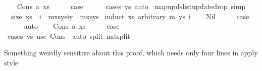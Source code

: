 \begin{isabellebody}
\isamarkupfalse%
\isanewline
\ \ \isamarkupfalse%
\ {\isacharparenleft}{\kern0pt}Cons\ a\ xs{\isacharparenright}{\kern0pt}\isanewline
\ \ \isamarkupfalse%
\ \isamarkupfalse%
\ {\isacharquery}{\kern0pt}case\isanewline
\ \ \ \ \isamarkupfalse%
\ {\isacharparenleft}{\kern0pt}cases\ ys{\isacharparenright}{\kern0pt}\ auto\isanewline
{}\isamarkupfalse%
%
\endisatagproof
{\isafoldproof}%
%
\isadelimproof
\isanewline
%
\endisadelimproof
\isanewline
{}\isamarkupfalse%
\ map{\isacharunderscore}{\kern0pt}upds{\isacharunderscore}{\kern0pt}list{\isacharunderscore}{\kern0pt}update{}{\isacharunderscore}{\kern0pt}drop\ {\isacharbrackleft}{\kern0pt}simp{\isacharbrackright}{\kern0pt}{\isacharcolon}{\kern0pt}\isanewline
\ \ {\isachardoublequoteopen}size\ xs\ {\isasymle}\ i\ {\isasymLongrightarrow}\ m{\isacharparenleft}{\kern0pt}xs{\isacharbrackleft}{\kern0pt}{\isasymmapsto}{\isacharbrackright}{\kern0pt}ys{\isacharbrackleft}{\kern0pt}i{\isacharcolon}{\kern0pt}{\isacharequal}{\kern0pt}y{\isacharbrackright}{\kern0pt}{\isacharparenright}{\kern0pt}\ {\isacharequal}{\kern0pt}\ m{\isacharparenleft}{\kern0pt}xs{\isacharbrackleft}{\kern0pt}{\isasymmapsto}{\isacharbrackright}{\kern0pt}ys{\isacharparenright}{\kern0pt}{\isachardoublequoteclose}\isanewline
%
\isadelimproof
%
\endisadelimproof
%
\isatagproof
{}\isamarkupfalse%
\ {\isacharparenleft}{\kern0pt}induct\ xs\ arbitrary{\isacharcolon}{\kern0pt}\ m\ ys\ i{\isacharparenright}{\kern0pt}\isanewline
\ \ \isamarkupfalse%
\ Nil\isanewline
\ \ \isamarkupfalse%
\ \isamarkupfalse%
\ {\isacharquery}{\kern0pt}case\isanewline
\ \ \ \ \isamarkupfalse%
\ auto\isanewline
{}\isamarkupfalse%
\isanewline
\ \ \isamarkupfalse%
\ {\isacharparenleft}{\kern0pt}Cons\ a\ xs{\isacharparenright}{\kern0pt}\isanewline
\ \ \isamarkupfalse%
\ \isamarkupfalse%
\ {\isacharquery}{\kern0pt}case\isanewline
\ \ \ \ \isamarkupfalse%
\ {\isacharparenleft}{\kern0pt}cases\ ys{\isacharparenright}{\kern0pt}\ {\isacharparenleft}{\kern0pt}use\ Cons\ \ {\isacartoucheopen}auto\ split{\isacharcolon}{\kern0pt}\ nat{\isachardot}{\kern0pt}split{\isacartoucheclose}{\isacharparenright}{\kern0pt}\isanewline
{}\isamarkupfalse%
%
\endisatagproof
{\isafoldproof}%
%
\isadelimproof
%
\endisadelimproof
%
\begin{isamarkuptext}%
Something weirdly sensitive about this proof, which needs only four lines in apply style%

\end{isamarkuptext}
\end{isabellebody}
